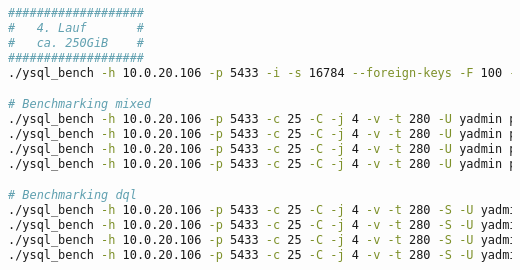 \begin{flushleft}
\begin{lstlisting}[language=bash, caption=YugabyteDB - Benchmarking-Commands,captionpos=b,label={lst:yugabytedb-benchmarking-commands},breaklines=true]
###################
#   4. Lauf       #
#   ca. 250GiB    #
###################
./ysql_bench -h 10.0.20.106 -p 5433 -i -s 16784 --foreign-keys -F 100 -I dtgvpf --index-tablespace=eval_index_tablespace --tablespace=eval_data_tablespace -U yadmin pgbench_eval_bench

# Benchmarking mixed
./ysql_bench -h 10.0.20.106 -p 5433 -c 25 -C -j 4 -v -t 280 -U yadmin pgbench_eval_bench > /home/gramic/4_1_yugabytedb_mixed_benchmark.txt
./ysql_bench -h 10.0.20.106 -p 5433 -c 25 -C -j 4 -v -t 280 -U yadmin pgbench_eval_bench > /home/gramic/4_2_yugabytedb_mixed_benchmark.txt
./ysql_bench -h 10.0.20.106 -p 5433 -c 25 -C -j 4 -v -t 280 -U yadmin pgbench_eval_bench > /home/gramic/4_3_yugabytedb_mixed_benchmark.txt
./ysql_bench -h 10.0.20.106 -p 5433 -c 25 -C -j 4 -v -t 280 -U yadmin pgbench_eval_bench > /home/gramic/4_4_yugabytedb_mixed_benchmark.txt

# Benchmarking dql
./ysql_bench -h 10.0.20.106 -p 5433 -c 25 -C -j 4 -v -t 280 -S -U yadmin pgbench_eval_bench > /home/gramic/4_1_yugabytedb_dql_benchmark.txt
./ysql_bench -h 10.0.20.106 -p 5433 -c 25 -C -j 4 -v -t 280 -S -U yadmin pgbench_eval_bench > /home/gramic/4_2_yugabytedb_dql_benchmark.txt
./ysql_bench -h 10.0.20.106 -p 5433 -c 25 -C -j 4 -v -t 280 -S -U yadmin pgbench_eval_bench > /home/gramic/4_3_yugabytedb_dql_benchmark.txt
./ysql_bench -h 10.0.20.106 -p 5433 -c 25 -C -j 4 -v -t 280 -S -U yadmin pgbench_eval_bench > /home/gramic/4_4_yugabytedb_dql_benchmark.txt
\end{lstlisting}
\end{flushleft}